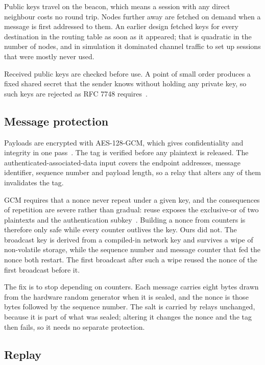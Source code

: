 \documentclass[conference]{IEEEtran}
\begin{document}
Public keys travel on the beacon, which means a session with any direct neighbour
costs no round trip. Nodes further away are fetched on demand when a message is
first addressed to them. An earlier design fetched keys for every destination in
the routing table as soon as it appeared; that is quadratic in the number of
nodes, and in simulation it dominated channel traffic to set up sessions that
were mostly never used.

Received public keys are checked before use. A point of small order produces a
fixed shared secret that the sender knows without holding any private key, so
such keys are rejected as RFC 7748 requires~\cite{rfc7748}.

\subsection{Message protection}

Payloads are encrypted with AES-128-GCM, which gives confidentiality and
integrity in one pass~\cite{dworkin2007gcm}. The tag is verified before any
plaintext is released. The authenticated-associated-data input covers the
endpoint addresses, message identifier, sequence number and payload length, so a
relay that alters any of them invalidates the tag.

GCM requires that a nonce never repeat under a given key, and the consequences of
repetition are severe rather than gradual: reuse exposes the exclusive-or of two
plaintexts and the authentication subkey~\cite{dworkin2007gcm}. Building a nonce
from counters is therefore only safe while every counter outlives the key. Ours
did not. The broadcast key is derived from a compiled-in network key and survives
a wipe of non-volatile storage, while the sequence number and message counter
that fed the nonce both restart. The first broadcast after such a wipe reused the
nonce of the first broadcast before it.

The fix is to stop depending on counters. Each message carries eight bytes drawn
from the hardware random generator when it is sealed, and the nonce is those
bytes followed by the sequence number. The salt is carried by relays unchanged,
because it is part of what was sealed; altering it changes the nonce and the tag
then fails, so it needs no separate protection.

\subsection{Replay}
\end{document}
